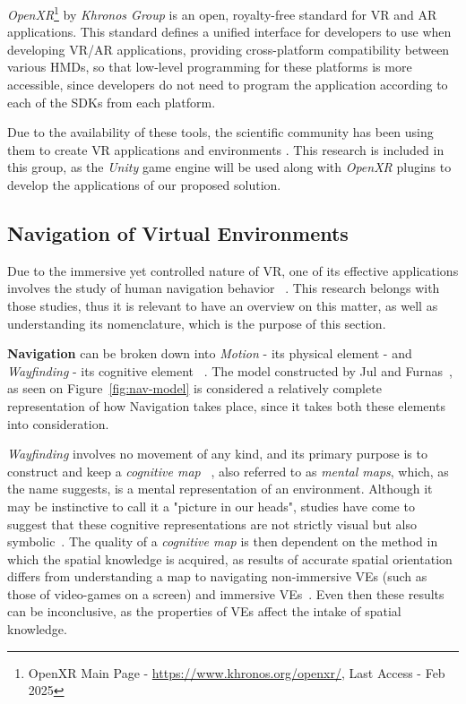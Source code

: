 \textit{OpenXR}\footnote{OpenXR Main Page - \href{https://www.khronos.org/openxr/}{https://www.khronos.org/openxr/}, Last Access - Feb 2025} by 
\textit{Khronos Group} is an open, royalty-free standard for \gls{VR} and \gls{AR} applications. This standard defines a unified interface 
for developers to use when developing \gls{VR}/\gls{AR} applications, providing cross-platform compatibility between various \glspl{HMD}, 
so that low-level programming for these platforms is more accessible, since developers do not need to program the application according to 
each of the \glspl{SDK} from each platform.

Due to the availability of these tools, the scientific community has been using them to create \gls{VR} applications and environments \cite{Anthes2016}. 
This research is included in this group, as the \textit{Unity} game engine will be used along with \textit{OpenXR} plugins to develop the applications 
of our proposed solution.  

\subsection{Navigation of Virtual Environments}
\label{sec:navigation-in-ves}

Due to the immersive yet controlled nature of \gls{VR}, one of its effective applications involves the study of human navigation behavior 
~\cite{Feng2022}. This research belongs with those studies, thus it is relevant to have an overview on this matter, as well as understanding its 
nomenclature, which is the purpose of this section.

\textbf{Navigation} can be broken down into \textit{Motion} - its physical element - and \textit{Wayfinding} - its cognitive element 
~\cite{Eastgate2014}. The model constructed by Jul and Furnas~\cite{Jul1997}, as seen on Figure~\ref{fig:nav-model} is considered a relatively complete representation 
of how Navigation takes place, since it takes both these elements into consideration.

\textit{Wayfinding} involves no movement of any kind, and its primary purpose is to construct and keep a \textit{cognitive map}
~\cite{Langbehn2018}, also referred to as \textit{mental maps}, which, as the name suggests, is a mental representation of an environment. 
Although it may be instinctive to call it a "picture in our heads", studies have come to suggest that these cognitive representations 
are not strictly visual but also symbolic~\cite{Eastgate2014, Warren2019}. The quality of a \textit{cognitive map} is then dependent on the 
method in which the spatial knowledge is acquired, as results of accurate spatial orientation differs from understanding a map to navigating  
non-immersive \glspl{VE} (such as those of video-games on a screen) and immersive \glspl{VE}~\cite{Eastgate2014,Santos2009}. Even then these 
results can be inconclusive, as the properties of \glspl{VE} affect the intake of spatial knowledge.

